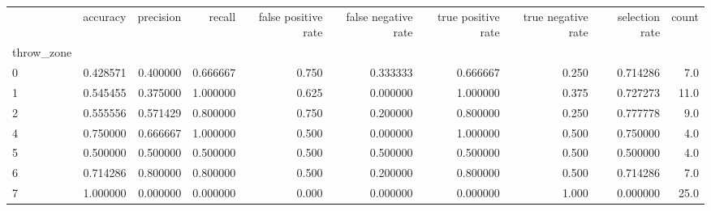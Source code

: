 \begin{tabular}{lrrrrrrrrr}
\toprule
{} &  accuracy &  precision &    recall &  false positive rate &  false negative rate &  true positive rate &  true negative rate &  selection rate &  count \\
throw\_zone &           &            &           &                      &                      &                     &                     &                 &        \\
\midrule
0          &  0.428571 &   0.400000 &  0.666667 &                0.750 &             0.333333 &            0.666667 &               0.250 &        0.714286 &    7.0 \\
1          &  0.545455 &   0.375000 &  1.000000 &                0.625 &             0.000000 &            1.000000 &               0.375 &        0.727273 &   11.0 \\
2          &  0.555556 &   0.571429 &  0.800000 &                0.750 &             0.200000 &            0.800000 &               0.250 &        0.777778 &    9.0 \\
4          &  0.750000 &   0.666667 &  1.000000 &                0.500 &             0.000000 &            1.000000 &               0.500 &        0.750000 &    4.0 \\
5          &  0.500000 &   0.500000 &  0.500000 &                0.500 &             0.500000 &            0.500000 &               0.500 &        0.500000 &    4.0 \\
6          &  0.714286 &   0.800000 &  0.800000 &                0.500 &             0.200000 &            0.800000 &               0.500 &        0.714286 &    7.0 \\
7          &  1.000000 &   0.000000 &  0.000000 &                0.000 &             0.000000 &            0.000000 &               1.000 &        0.000000 &   25.0 \\
\bottomrule
\end{tabular}
